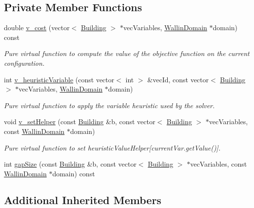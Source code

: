 \subsection*{Private Member Functions}
\begin{DoxyCompactItemize}
\item 
double \hyperlink{classghost_1_1GapObj_a55b7f1bf57a44915f6a35a651cf82e5b}{v\-\_\-cost} (vector$<$ \hyperlink{classghost_1_1Building}{Building} $>$ $\ast$vec\-Variables, \hyperlink{classghost_1_1WallinDomain}{Wallin\-Domain} $\ast$domain) const 
\begin{DoxyCompactList}\small\item\em Pure virtual function to compute the value of the objective function on the current configuration. \end{DoxyCompactList}\item 
int \hyperlink{classghost_1_1GapObj_a6cbd377f5f11676d918fcdf65f384cd3}{v\-\_\-heuristic\-Variable} (const vector$<$ int $>$ \&vec\-Id, const vector$<$ \hyperlink{classghost_1_1Building}{Building} $>$ $\ast$vec\-Variables, \hyperlink{classghost_1_1WallinDomain}{Wallin\-Domain} $\ast$domain)
\begin{DoxyCompactList}\small\item\em Pure virtual function to apply the variable heuristic used by the solver. \end{DoxyCompactList}\item 
void \hyperlink{classghost_1_1GapObj_afd55a0b02e6336d2a1f17e015488aa45}{v\-\_\-set\-Helper} (const \hyperlink{classghost_1_1Building}{Building} \&b, const vector$<$ \hyperlink{classghost_1_1Building}{Building} $>$ $\ast$vec\-Variables, const \hyperlink{classghost_1_1WallinDomain}{Wallin\-Domain} $\ast$domain)
\begin{DoxyCompactList}\small\item\em Pure virtual function to set heuristic\-Value\-Helper\mbox{[}current\-Var.\-get\-Value()\mbox{]}. \end{DoxyCompactList}\item 
int \hyperlink{classghost_1_1GapObj_abafdce010b63555042086d198f08f05d}{gap\-Size} (const \hyperlink{classghost_1_1Building}{Building} \&b, const vector$<$ \hyperlink{classghost_1_1Building}{Building} $>$ $\ast$vec\-Variables, const \hyperlink{classghost_1_1WallinDomain}{Wallin\-Domain} $\ast$domain) const 
\end{DoxyCompactItemize}
\subsection*{Additional Inherited Members}


